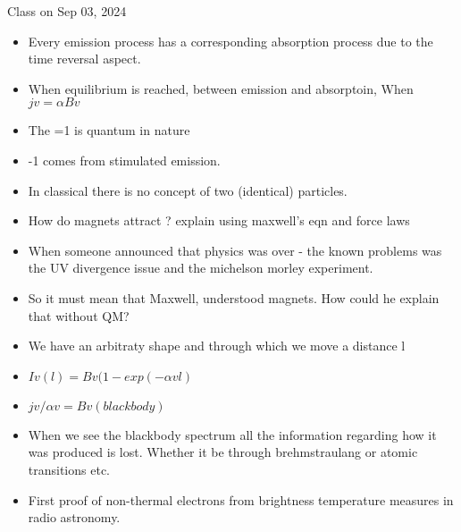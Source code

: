 \documentclass{../template/texnote}
\begin{document}
Class on Sep 03, 2024

\begin{itemize}
\tightlist
\item
  Every emission process has a corresponding absorption process due to
  the time reversal aspect.
\item
  When equilibrium is reached, between emission and absorptoin, When $jv
  = \alpha Bv$
\item
  The =1 is quantum in nature
\item
  -1 comes from stimulated emission.
\item
  In classical there is no concept of two (identical) particles.
\item
  How do magnets attract ? explain using maxwell's eqn and force laws
\item
  When someone announced that physics was over - the known problems was
  the UV divergence issue and the michelson morley experiment.
\item
  So it must mean that Maxwell, understood magnets. How could he explain
  that without QM?
\item
  We have an arbitraty shape and through which we move a distance l
\item
  $Iv(l) = Bv ( 1-exp(-\alpha v l)$
\item
  $jv/\alpha v = B v (blackbody)$
\item
  When we see the blackbody spectrum all the information regarding how
  it was produced is lost. Whether it be through brehmstraulang or
  atomic transitions etc.
\item
  First proof of non-thermal electrons from brightness temperature
  measures in radio astronomy.
\end{itemize}
    \printbibliography
\end{document}
